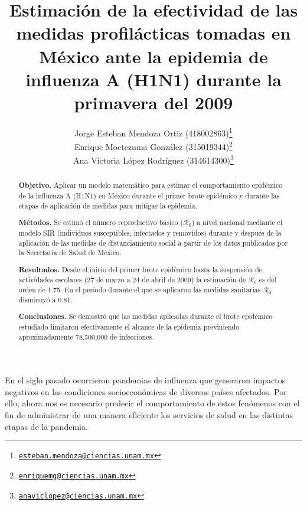 \documentclass[12pt]{article}
\newcommand{\absdiv}[1]{%
  \par\addvspace{.5\baselineskip}%
  \noindent\textbf{#1}\quad\ignorespaces
}
\begin{document}
	\title{Estimación de la efectividad de las medidas profilácticas tomadas en México ante la epidemia de influenza A (H1N1) durante la primavera del 2009}
	\author{Jorge Esteban Mendoza Ortiz (418002863)\thanks{\href{mailto:esteban.mendoza@ciencias.unam.mx}{\nolinkurl{esteban.mendoza@ciencias.unam.mx}}} \\
	Enrique Moctezuma González (315019344)\thanks{\href{mailto:enriquemg@ciencias.unam.mx}{\nolinkurl{enriquemg@ciencias.unam.mx}}}\\
	Ana Victoria López Rodríguez (314614300)\thanks{\href{anaviclopez@ciencias.unam.mx}{\nolinkurl{anaviclopez@ciencias.unam.mx}}}}
	\date{}
	\maketitle
	
	\begin{abstract}
	\absdiv{Objetivo.} Aplicar un modelo matemático para estimar el comportamiento epidémico de la influenza A (H1N1) en México durante el primer brote epidémico y durante las etapas de aplicación de medidas para mitigar la epidemia.
	
	\absdiv{Métodos.} Se estimó el número reproductivo básico ($\mathcal{R}_0$) a nivel nacional mediante el modelo SIR (individuos susceptibles, infectados y removidos) durante y después de la aplicación de las medidas de distanciamiento social a partir de los datos publicados por la Secretaría de Salud de México.
	
	\absdiv{Resultados.} Desde el inicio del primer brote epidémico hasta la suspensión de actividades escolares (27 de marzo a 24 de abril de 2009) la estimación de $ \mathcal{R}_0 $ es del orden de 1.75. En el período durante el que se aplicaron las medidas sanitarias $ \mathcal{R}_0 $ disminuyó a 0.81.
	
	\absdiv{Conclusiones.} Se demostró que las medidas aplicadas durante el brote epidémico estudiado limitaron efectivamente el alcance de la epidemia previniendo aproximadamente 78,500,000 de infecciones.
	\end{abstract}
	
	\noindent En el siglo pasado ocurrieron pandemias de influenza que generaron impactos negativos en las condiciones socioeconómicas de diversos países afectados. Por ello, ahora nos es necesario predecir el comportamiento de estos fenómenos con el fin de administrar de una manera eficiente los servicios de salud en las distintas etapas de la pandemia. 
	
\end{document}
